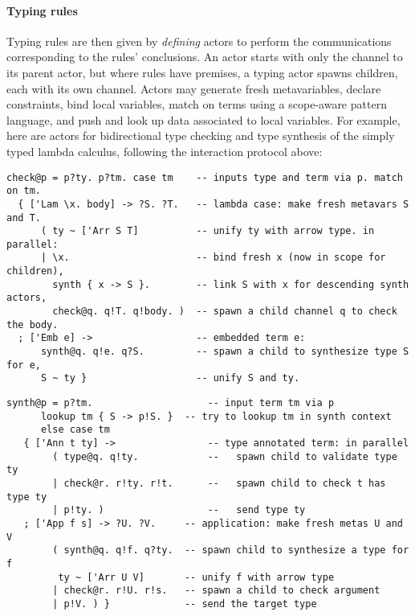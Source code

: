 \documentclass{easychair}
\newcommand{\tm}[1]{\texttt{#1}\;}
\newcommand{\x}{\tm{x}}
\begin{document}
\paragraph{Typing rules}
Typing rules are then given by \emph{defining} actors to
perform the communications corresponding to the rules' conclusions. An
actor starts with only the channel to its parent actor, but where
rules have premises, a typing actor spawns children, each with its own
channel.  %
Actors may generate fresh metavariables, declare constraints, bind
local variables, match on terms using a
scope-aware pattern language, and push and look up data associated to
local variables.
%
For example, here are actors for bidirectional type checking and type synthesis of the simply typed lambda calculus, following the interaction protocol above:
%
\begin{lstlisting}[columns=fullflexible,keepspaces=true]
check@p = p?ty. p?tm. case tm    -- inputs type and term via p. match on tm.
  { ['Lam \x. body] -> ?S. ?T.   -- lambda case: make fresh metavars S and T.
      ( ty ~ ['Arr S T]          -- unify ty with arrow type. in parallel:
      | \x.                      -- bind fresh x (now in scope for children),
        synth { x -> S }.        -- link S with x for descending synth actors,
        check@q. q!T. q!body. )  -- spawn a child channel q to check the body.
  ; ['Emb e] ->                  -- embedded term e:
      synth@q. q!e. q?S.         -- spawn a child to synthesize type S for e,
      S ~ ty }                   -- unify S and ty.
\end{lstlisting}

\begin{lstlisting}[columns=fullflexible,keepspaces=true]
synth@p = p?tm.                    -- input term tm via p
	  lookup tm { S -> p!S. }  -- try to lookup tm in synth context
	  else case tm
   { ['Ann t ty] ->                -- type annotated term: in parallel
        ( type@q. q!ty.            --   spawn child to validate type ty
        | check@r. r!ty. r!t.      --   spawn child to check t has type ty
        | p!ty. )                  --   send type ty
   ; ['App f s] -> ?U. ?V.     -- application: make fresh metas U and V
        ( synth@q. q!f. q?ty.  -- spawn child to synthesize a type for f
         ty ~ ['Arr U V]       -- unify f with arrow type
        | check@r. r!U. r!s.   -- spawn a child to check argument
        | p!V. ) }             -- send the target type
\end{lstlisting}
\end{document}
